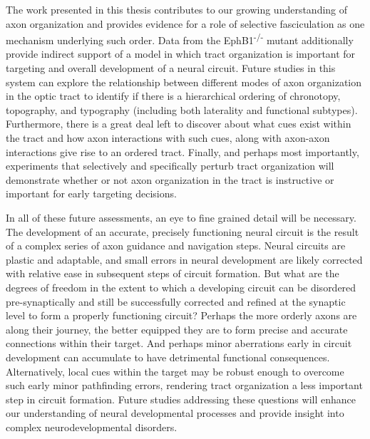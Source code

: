 The work presented in this thesis contributes to our growing understanding of axon organization and provides evidence for a role of selective fasciculation as one mechanism underlying such order.
Data from the EphB1\textsuperscript{-/-} mutant additionally provide indirect support of a model in which tract organization is important for targeting and overall development of a neural circuit.
Future studies in this system can explore the relationship between different modes of axon organization in the optic tract to identify if there is a hierarchical ordering of chronotopy, topography, and typography (including both laterality and functional subtypes).
Furthermore, there is a great deal left to discover about what cues exist within the tract and how axon interactions with such cues, along with axon-axon interactions give rise to an ordered tract.
Finally, and perhaps most importantly, experiments that selectively and specifically perturb tract organization will demonstrate whether or not axon organization in the tract is instructive or important for early targeting decisions.

In all of these future assessments, an eye to fine grained detail will be necessary.
The development of an accurate, precisely functioning neural circuit is the result of a complex series of axon guidance and navigation steps.
Neural circuits are plastic and adaptable, and small errors in neural development are likely corrected with relative ease in subsequent steps of circuit formation.
But what are the degrees of freedom in the extent to which a developing circuit can be disordered pre-synaptically and still be successfully corrected and refined at the synaptic level to form a properly functioning circuit?
Perhaps the more orderly axons are along their journey, the better equipped they are to form precise and accurate connections within their target.
And perhaps minor aberrations early in circuit development can accumulate to have detrimental functional consequences.
Alternatively, local cues within the target may be robust enough to overcome such early minor pathfinding errors, rendering tract organization a less important step in circuit formation.
Future studies addressing these questions will enhance our understanding of neural developmental processes and provide insight into complex neurodevelopmental disorders.